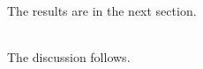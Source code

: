 \documentclass{article}
\begin{document}
The results are in the next section.

\\
The discussion follows.
\end{document}

